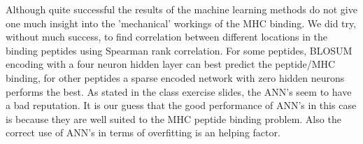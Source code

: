 Although quite successful the results of the machine learning methods do not give one much insight into the 'mechanical' workings of the MHC binding.
We did try, without much success, to find correlation between different locations in the binding peptides using Spearman rank correlation.
For some peptides, BLOSUM encoding with a four
neuron hidden layer can best predict the
peptide/MHC binding, for other peptides a sparse
encoded network with zero hidden neurons performs
the best.
As stated in the class exercise slides, the ANN's seem to have a bad reputation. 
It is our guess that the good performance of ANN's in this case is because they are well suited to the MHC peptide binding problem. 
Also the correct use of ANN's in terms of overfitting is an helping factor.
